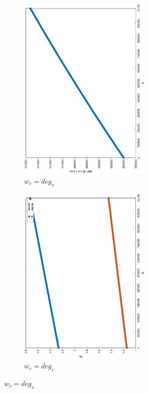 \documentclass[12pt]{report}
\begin{document}
\begin{figure}
\begin{subfigure}{0.35\textwidth}
	\includegraphics[width=0.7\textwidth,angle=-90]{graph/uniform_coverage_1000000_10000000_0.1_power_1.eps}
	\caption{$ w_v = \mathit{deg}_v $}
\end{subfigure}
\begin{subfigure}{0.35\textwidth}
	\includegraphics[width=0.7\textwidth,angle=-90]{graph/uniform_q_1000000_10000000_0.1_power_1.eps}
	\caption{$ w_v = \mathit{deg}_v $}
\end{subfigure}


\end{figure}
\end{document}
